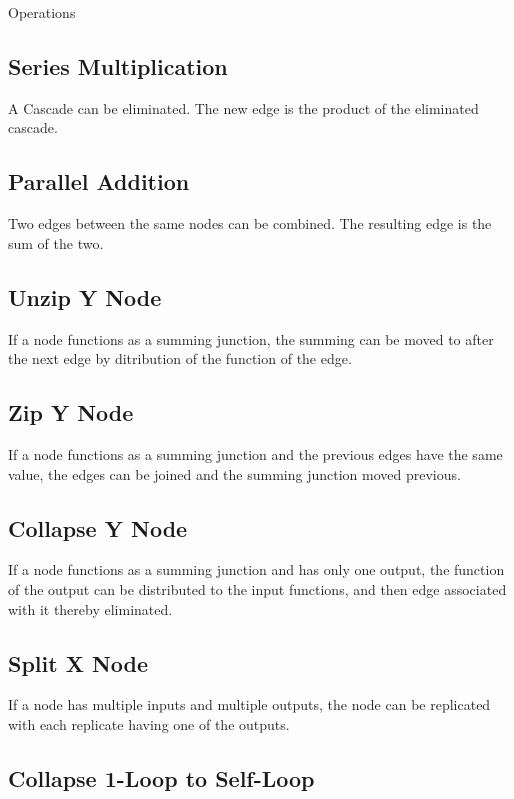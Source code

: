 \documentclass{../templates/topic}
\begin{document}
\begin{section}{Operations}
	
	
	\subsection{Series Multiplication}
	
		A Cascade can be eliminated. The new edge is the product of the eliminated cascade.
	
	\subsection{Parallel Addition}
	
		Two edges between the same nodes can be combined. The resulting edge is the sum of the two.
	
	\subsection{Unzip Y Node}
	
		If a node functions as a summing junction, the summing can be moved to after the next edge by ditribution of the function of the edge.
	
	\subsection{Zip Y Node}
	
		If a node functions as a summing junction and the previous edges have the same value, the edges can be joined and the summing junction moved previous.
	
	\subsection{Collapse Y Node}
	
		If a node functions as a summing junction and has only one output, the function of the output can be distributed to the input functions, and then edge associated with it thereby eliminated.
		
	\subsection{Split X Node}
		If a node has multiple inputs and multiple outputs, the node can be replicated with each replicate having one of the outputs.
	
	\subsection{Collapse 1-Loop to Self-Loop}
	

\end{section}
\end{document}
